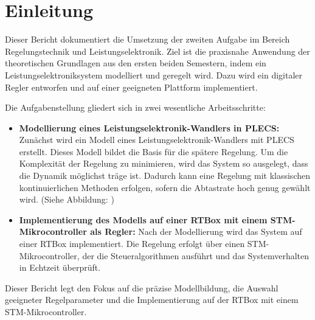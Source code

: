 \section{Einleitung} \label{sec:einleitung}

Dieser Bericht dokumentiert die Umsetzung der zweiten Aufgabe im Bereich Regelungstechnik und Leistungselektronik. Ziel ist die praxisnahe Anwendung der theoretischen Grundlagen aus den ersten beiden Semestern, indem ein Leistungselektroniksystem modelliert und geregelt wird. Dazu wird ein digitaler Regler entworfen und auf einer geeigneten Plattform implementiert.

Die Aufgabenstellung gliedert sich in zwei wesentliche Arbeitsschritte:
\begin{itemize}
    \item \textbf{Modellierung eines Leistungselektronik-Wandlers in PLECS:}
    Zunächst wird ein Modell eines Leistungselektronik-Wandlers mit PLECS erstellt. Dieses Modell bildet die Basis für die spätere Regelung. Um die Komplexität der Regelung zu minimieren, wird das System so ausgelegt, dass die Dynamik möglichst träge ist. Dadurch kann eine Regelung mit klassischen kontinuierlichen Methoden erfolgen, sofern die Abtastrate hoch genug gewählt wird.  (Siehe Abbildung: \label{fig:Soft})

    \item \textbf{Implementierung des Modells auf einer RTBox mit einem STM-Mikrocontroller als Regler:}
    Nach der Modellierung wird das System auf einer RTBox implementiert. Die Regelung erfolgt über einen STM-Mikrocontroller, der die Steueralgorithmen ausführt und das Systemverhalten in Echtzeit überprüft.
\end{itemize}

Dieser Bericht legt den Fokus auf die präzise Modellbildung, die Auswahl geeigneter Regelparameter und die Implementierung auf der RTBox mit einem STM-Mikrocontroller.